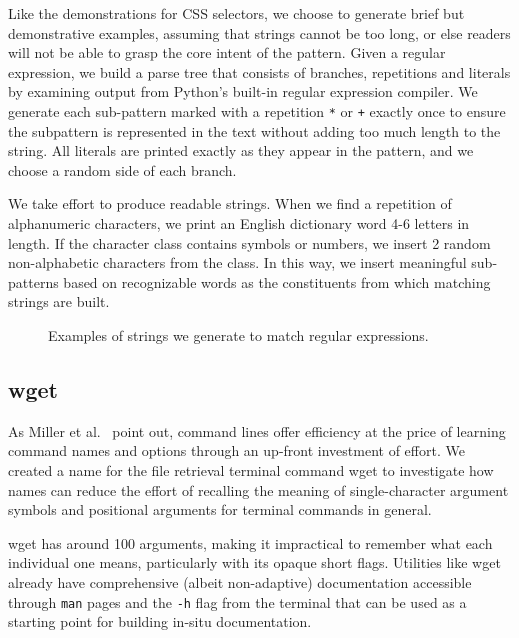 Like the demonstrations for CSS selectors, we choose to generate brief but demonstrative examples, assuming that strings cannot be too long, or else readers will not be able to grasp the core intent of the pattern.
Given a regular expression, we build a parse tree that consists of branches, repetitions and literals by examining output from Python's built-in regular expression compiler.
We generate each sub-pattern marked with a repetition \texttt{*} or \texttt{+} exactly once to ensure the subpattern is represented in the text without adding too much length to the string.
All literals are printed exactly as they appear in the pattern, and we choose a random side of each branch. 

We take effort to produce readable strings.
When we find a repetition of alphanumeric characters, we print an English dictionary word 4-6 letters in length.
If the character class contains symbols or numbers, we insert 2 random non-alphabetic characters from the class.
In this way, we insert meaningful sub-patterns based on recognizable words as the constituents from which matching strings are built.
\fi

\begin{figure}
\centering
\setlength{\fboxsep}{10pt}
\noindent{}
\caption{Examples of strings we generate to match regular expressions.}
\label{fig:regex_strings}
\end{figure}

\subsection{wget}

\begin{changes}
As Miller et al.~\cite{miller_inky_2008} point out, command lines offer efficiency at the price of learning command names and options through an up-front investment of effort.
We created a \gls{name} for the file retrieval terminal command wget to investigate how \glspl{name} can reduce the effort of recalling the meaning of single-character argument symbols and positional arguments for terminal commands in general.
\end{changes}
wget has around 100 arguments, making it impractical to remember what each individual one means, particularly with its opaque short flags.
Utilities like wget already have comprehensive (albeit non-adaptive) documentation accessible through \texttt{man} pages and the \texttt{-h} flag from the terminal that can be used as a starting point for building in-situ documentation.

